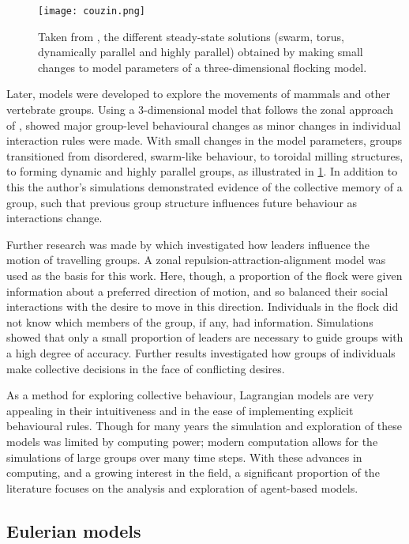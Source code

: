 \begin{figure}[t]
	\texttt{[image: couzin.png]}
	\caption{Taken from \citet{couzin02}, the different steady-state solutions (swarm, torus, dynamically parallel and highly parallel) obtained by making small changes to model parameters of a three-dimensional flocking model.}
	\label{fig:couzin}
\end{figure}

Later, models were developed to explore the movements of mammals and other vertebrate groups. Using a $3$-dimensional model that follows the zonal approach of \citet{aoki82}, \citet{couzin02} showed major group-level behavioural changes as minor changes in individual interaction rules were made. With small changes in the model parameters, groups transitioned from disordered, swarm-like behaviour, to toroidal milling structures, to forming dynamic and highly parallel groups, as illustrated in \cref{fig:couzin}. In addition to this the author's simulations demonstrated evidence of the collective memory of a group, such that previous group structure influences future behaviour as interactions change.

Further research was made by \citet{couzin05} which investigated how leaders influence the motion of travelling groups. A zonal repulsion-attraction-alignment model was used as the basis for this work. Here, though, a proportion of the flock were given information about a preferred direction of motion, and so balanced their social interactions with the desire to move in this direction. Individuals in the flock did not know which members of the group, if any, had information. Simulations showed that only a small proportion of leaders are necessary to guide groups with a high degree of accuracy. Further results investigated how groups of individuals make collective decisions in the face of conflicting desires.

As a method for exploring collective behaviour, Lagrangian models are very appealing in their intuitiveness and in the ease of implementing explicit behavioural rules. Though for many years the simulation and exploration of these models was limited by computing power; modern computation allows for the simulations of large groups over many time steps. With these advances in computing, and a growing interest in the field, a significant proportion of the literature focuses on the analysis and exploration of agent-based models.

\subsection{Eulerian models}
\label{ssec:eulerian_models}

